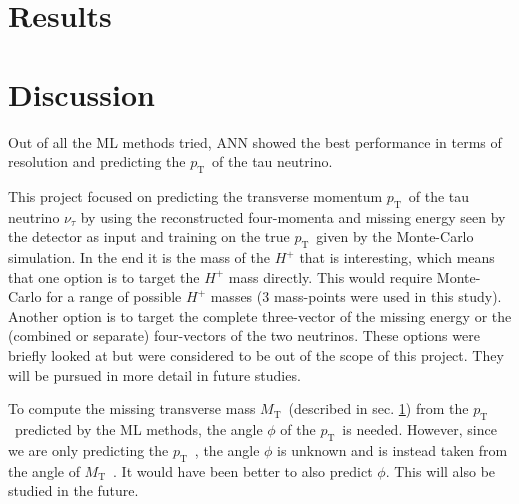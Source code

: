 \documentclass{scrartcl}
\newcommand{\pt}{\ensuremath{p_\text{T}}~}
\newcommand{\mt}{\ensuremath{M_\text{T}}~}
\begin{document}
\section{Results}
\label{sec:results}


\section{Discussion}

Out of all the \gls{ML} methods tried, \gls{ANN} showed the best performance in terms of resolution and predicting the \pt of the tau neutrino.

This project focused on predicting the transverse momentum \pt of the tau neutrino $\nu_\tau$ by using the reconstructed four-momenta and missing energy seen by the detector as input and training on the true \pt given by the Monte-Carlo simulation. In the end it is the mass of the $H^+$ that is interesting, which means that one option is to target the $H^+$ mass directly. This would require Monte-Carlo for a range of possible $H^+$ masses (3 mass-points were used in this study). Another option is to target the complete three-vector of the missing energy or the (combined or separate) four-vectors of the two neutrinos. These options were briefly looked at but were considered to be out of the scope of this project. They will be pursued in more detail in future studies.

To compute the missing transverse mass \mt (described in sec. \ref{sec:results}) from the \pt predicted by the \gls{ML} methods, the angle $\phi$ of the \pt is needed. However, since we are only predicting the \pt, the angle $\phi$ is unknown and is instead taken from the angle of \mt. It would have been better to also predict $\phi$. This will also be studied in the future.



\end{document}
